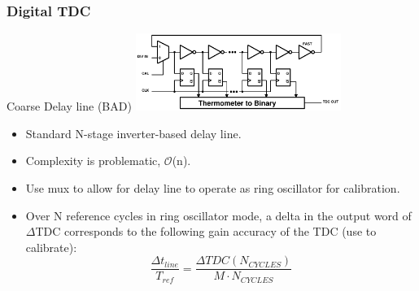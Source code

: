 \documentclass[t, screen, aspectratio=43]{beamer}
\begin{document}
\begin{frame}
	\frametitle{Digital TDC}
	\begin{block}{Coarse Delay line (BAD)}
			\vspace{-0.5em}
			\center\includegraphics[width=0.5\textwidth, angle=0]{tdc_cal.pdf}	
		\begin{itemize}[itemsep=4pt,label=\protect---]
			\scriptsize
			\item Standard N-stage inverter-based delay line.
			\item Complexity is problematic, $\mathcal{O}$(n).
			\item Use mux to allow for delay line to operate as ring oscillator for calibration.
			\item Over N reference cycles in ring oscillator mode, a delta in the output word of $\Delta$TDC corresponds to the following gain accuracy of the TDC (use to calibrate):
			\tiny
			\begin{equation}
				\frac{\Delta t_{line}}{T_{ref}} = \frac{\Delta TDC(N_{CYCLES})}{M\cdot N_{CYCLES}}
			\end{equation}
			\scriptsize	
		\end{itemize}

	\end{block}
\end{frame}
\end{document}
